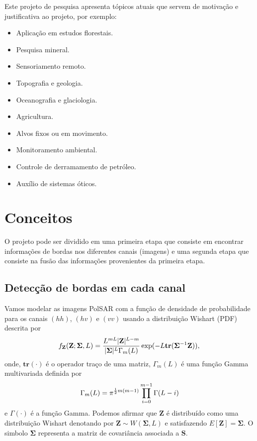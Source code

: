 \documentclass[runningheads]{llncs}
\begin{document}
Este projeto de pesquisa apresenta tópicos atuais que servem de motivação e justificativa ao projeto, por exemplo:
\begin{itemize}
\item Aplicação em estudos florestais.
\item Pesquisa mineral.
\item Sensoriamento remoto.
\item Topografia e geologia.
\item Oceanografia e glaciologia.
\item Agricultura.
\item Alvos fixos ou em movimento.
\item Monitoramento ambiental.
\item Controle de derramamento de petróleo.
\item Auxílio de sistemas óticos.
\end{itemize}

\section{Conceitos}
O projeto pode ser dividido em uma primeira etapa que consiste em encontrar informações de bordas nos diferentes canais (imagens) e uma segunda etapa que consiste na fusão das informações provenientes da primeira etapa. 
\subsection{Detecção de bordas em cada canal}
 Vamos modelar as imagens PolSAR com a função de densidade de probabilidade para os canais $(hh)$, $(hv)$ e $(vv)$ usando a distribuição Wishart (PDF) descrita por
\begin{equation}
    f_{\mathbf{Z}}(\mathbf{Z};\mathbf{\Sigma},L)=\frac{L^{mL}|\mathbf{Z}|^{L-m}}{|\mathbf{\Sigma}|^{L}\Gamma_m(L)} \exp(-L\mathbf{tr}(\mathbf{\Sigma}^{-1}\mathbf{Z})), \\
\end{equation} 
onde, $\mathbf{tr}(\cdot)$ é o operador traço de uma matriz, $\Gamma_m(L)$ é uma função Gamma multivariada definida por
\begin{equation}\label{cap_acf_10}
	\Gamma_m(L)=\pi^{\frac{1}{2}m(m-1)} \prod_{i=0}^{m-1}\Gamma(L-i) \\
\end{equation}
e $\Gamma(\cdot)$ é a função Gamma. Podemos afirmar que $\mathbf{Z}$ é distribuído como uma distribuição Wishart denotando por $\mathbf{Z}\sim W(\mathbf{\Sigma}, L)$ e satisfazendo $E[\mathbf{Z}]=\mathbf{\Sigma}$. O simbolo $\mathbf{\Sigma}$ representa a matriz de covariância associada a $\mathbf{S}$.
 
\end{document}
